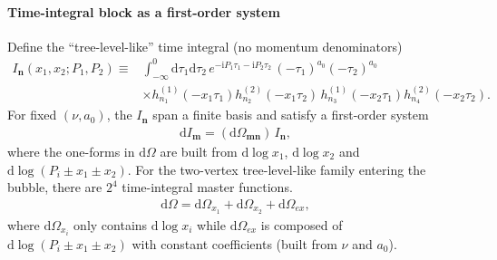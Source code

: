 \documentclass[a4paper,12pt]{article}
\def\di{{\mathrm{d}}}
\def\ii{\mathrm{i}}
\begin{document}
\paragraph{Time-integral block as a first-order system}
Define the ``tree-level-like'' time integral (no momentum denominators)
\begin{align}
	I_{\bm n}(x_1,x_2;P_1,P_2)\equiv & \int_{-\infty}^0 \di\tau_1\di\tau_2\,e^{-\ii P_1\tau_1-\ii P_2\tau_2}\,(-\tau_1)^{a_0}(-\tau_2)^{a_0} \nonumber\\
	&\times h_{n_1}^{(1)}(-x_1\tau_1)h_{n_2}^{(2)}(-x_1\tau_2)\,h_{n_3}^{(1)}(-x_2\tau_1)h_{n_4}^{(2)}(-x_2\tau_2).
\end{align}
For fixed $(\nu,a_0)$, the $I_{\bm n}$ span a finite basis and satisfy a first-order system
\begin{align}
	\di I_{\bm m}=(\di\Omega_{\bm m\bm n})\,I_{\bm n},
\end{align}
where the one-forms in $\di\Omega$ are built from $\di\log x_1$, $\di\log x_2$ and $\di\log(P_i\pm x_1\pm x_2)$.
For the two-vertex tree-level-like family entering the bubble, there are $2^4$ time-integral master functions.
\begin{align}
	\di\Omega=\di\Omega_{x_1}+\di\Omega_{x_2}+\di\Omega_{ex},
\end{align}
where $\di\Omega_{x_i}$ only contains $\di\log x_i$ while $\di\Omega_{ex}$ is composed of $\di\log(P_i\pm x_1\pm x_2)$ with constant coefficients (built from $\nu$ and $a_0$).
\end{document}
